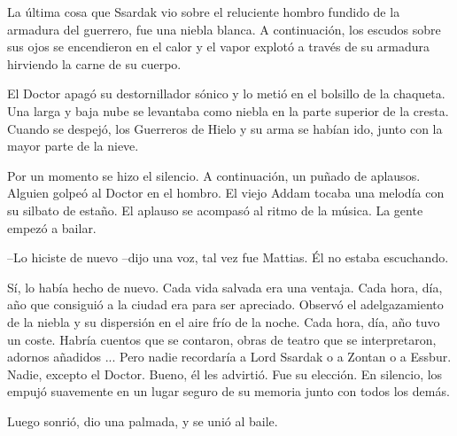 La última cosa que Ssardak vio sobre el reluciente hombro fundido de la armadura del guerrero, fue una niebla blanca. A continuación, los escudos sobre sus ojos se encendieron en el calor y el vapor explotó a través de su armadura hirviendo la carne de su cuerpo.



\mbox{}



El Doctor apagó su destornillador sónico y lo metió en el bolsillo de la chaqueta. Una larga y baja  nube se levantaba como niebla en la parte superior de la cresta. Cuando se despejó, los Guerreros de Hielo y su arma se habían ido, junto con la mayor parte de la nieve.



Por un momento se hizo el silencio. A continuación, un puñado de aplausos. Alguien golpeó al Doctor en el hombro. El viejo Addam tocaba una melodía con su silbato de estaño. El aplauso se acompasó al ritmo de la música. La gente empezó a bailar.



--Lo hiciste de nuevo --dijo una voz, tal vez fue Mattias. Él no estaba escuchando.



Sí, lo había hecho de nuevo. Cada vida salvada era una ventaja. Cada hora, día, año que consiguió a la ciudad era para ser apreciado. Observó el adelgazamiento de la niebla y su dispersión en el aire frío de la noche. Cada hora, día, año tuvo un coste. Habría cuentos que se contaron, obras de teatro que se interpretaron, adornos añadidos ... Pero nadie recordaría a Lord Ssardak o a Zontan o a Essbur. Nadie, excepto el Doctor. Bueno, él les advirtió. Fue su elección. En silencio, los empujó suavemente en un lugar seguro de su memoria junto con todos los demás.



Luego sonrió, dio una palmada, y se unió al baile.
